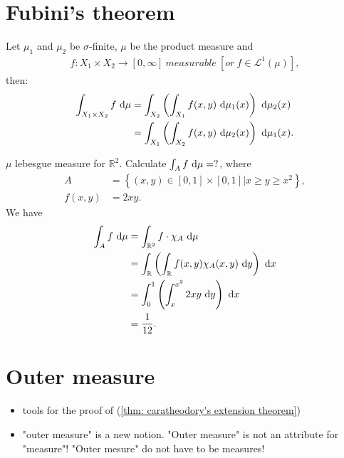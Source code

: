 \documentclass[../../note.tex]{subfiles}
\begin{document}
\section{Fubini's theorem}
\begin{theorem}
    Let $\mu_1$ and $\mu_2$ be $\sigma$-finite, $\mu$ be the product measure and 
    \begin{align}
        f: X_1 \times X_2 \rightarrow [0,\infty]~measurable~[or~f \in \mathcal{L}^1(\mu)],
    \end{align}
    then:
    \begin{align}
        \int_{X_1 \times X_2} f~{\rm d}\mu
        &= \int_{X_2} \left(\int_{X_1} f(x,y)~{\rm d}\mu_1(x)\right)~{\rm d}\mu_2(x) \\
        &= \int_{X_1} \left(\int_{X_2} f(x,y)~{\rm d}\mu_2(x)\right)~{\rm d}\mu_1(x).
    \end{align}
\end{theorem}

\begin{example}
    $\mu$ lebesgue measure for $\mathbb{R}^2$. Calculate $\int_A f~{\rm d}\mu = ?$, where
    \begin{align}
        A
        &= \left\{(x,y)\in [0,1] \times [0,1] \vert x \geq y \geq x^2 \right\}, \\
        f(x,y)
        &= 2xy.
    \end{align}
    We have
    \begin{align}
        \int_A f~{\rm d}\mu
        &= \int_{\mathbb{R}^2} f\cdot \chi_A~{\rm d}\mu \\
        &= \int_{\mathbb{R}} \left(\int_{\mathbb{R}} f(x,y)\chi_A(x,y)~{\rm d}y\right)~{\rm d}x \\
        &= \int_0^1\left(\int_{x}^{x^2} 2xy~{\rm d}y\right)~{\rm d}x \\
        &= \frac{1}{12}.
    \end{align}
\end{example}

\section{Outer measure}
\begin{itemize}
    \item tools for the proof of (\ref{thm: caratheodory's extension theorem})
    \item "outer measure" is a new notion. "Outer measure" is not an attribute for "measure"! "Outer mesure" do not have to be measures!
\end{itemize}
\end{document}
